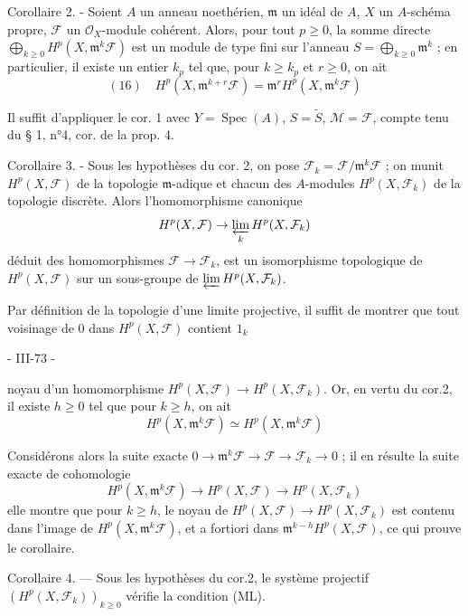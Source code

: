 Corollaire 2. - Soient $A$ un anneau noethérien, $\mathfrak{m}$ un idéal de $A$, $X$ un $A$-schéma propre, $\mathcal{F}$ un $\mathcal{O}_X$-module cohérent. Alors, pour tout $p \ge 0$, la somme directe $\bigoplus_{k \ge 0} H^p (X, \mathfrak{m}^k \mathcal{F})$ est un module de type fini sur l'anneau $S = \bigoplus_{k \ge 0} \mathfrak{m}^k$ ; en particulier, il existe un entier $k_p$ tel que, pour $k \ge k_p$ et $r \ge 0$, on ait
$$(16) \quad H^p (X, \mathfrak{m}^{k+r} \mathcal{F}) = \mathfrak{m}^r H^p (X, \mathfrak{m}^k \mathcal{F})$$

Il suffit d'appliquer le cor. 1 avec $Y = \operatorname{Spec}(A)$, $S = \tilde{S}$, $\mathcal{M} = \mathcal{F}$, compte tenu du § 1, n°4, cor. de la prop. 4.

Corollaire 3. - Sous les hypothèses du cor. 2, on pose $\mathcal{F}_k = \mathcal{F}/\mathfrak{m}^k \mathcal{F}$ ; on munit $H^p (X, \mathcal{F})$ de la topologie $\mathfrak{m}$-adique et chacun des $A$-modules $H^p (X, \mathcal{F}_k)$ de la topologie discrète. Alors l'homomorphisme canonique
$$H^p (X, \mathcal{F}) \to \varprojlim_k H^p (X, \mathcal{F}_k)$$
déduit des homomorphismes $\mathcal{F} \to \mathcal{F}_k$, est un isomorphisme topologique de $H^p (X, \mathcal{F})$ sur un sous-groupe de $\varprojlim H^p (X, \mathcal{F}_k)$.

Par définition de la topologie d'une limite projective, il suffit de montrer que tout voisinage de 0 dans $H^p (X, \mathcal{F})$ contient $1_k$

\newpage


- III-73 -

noyau d'un homomorphisme $H^p(X, \mathcal{F}) \to H^p(X, \mathcal{F}_k)$. Or, en vertu du cor.2, il existe $h \ge 0$ tel que pour $k \ge h$, on ait
$$H^p(X, \mathfrak{m}^k \mathcal{F}) \simeq H^p(X, \mathfrak{m}^k \mathcal{F})$$

Considérons alors la suite exacte $0 \to \mathfrak{m}^k \mathcal{F} \to \mathcal{F} \to \mathcal{F}_k \to 0$ ; il en résulte la suite exacte de cohomologie
$$H^p(X, \mathfrak{m}^k \mathcal{F}) \to H^p(X, \mathcal{F}) \to H^p(X, \mathcal{F}_k)$$
elle montre que pour $k \ge h$, le noyau de $H^p(X, \mathcal{F}) \to H^p(X, \mathcal{F}_k)$ est contenu dans l'image de $H^p(X, \mathfrak{m}^k \mathcal{F})$, et a fortiori dans $\mathfrak{m}^{k-h} H^p(X, \mathcal{F})$, ce qui prouve le corollaire.

Corollaire 4. — Sous les hypothèses du cor.2, le système projectif $(H^p(X, \mathcal{F}_k))_{k \ge 0}$ vérifie la condition (ML).

